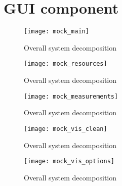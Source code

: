  
%


\section{GUI component}
\label{sec:arch_gui}

\begin{figure}[h]
  \centering
  \texttt{[image: mock\_main]}
  \caption{Overall system decomposition}
  \label{fig:arch_overall}
\end{figure}


\begin{figure}[h]
  \centering
  \texttt{[image: mock\_resources]}
  \caption{Overall system decomposition}
  \label{fig:arch_overall}
\end{figure}

\begin{figure}[h]
  \centering
  \texttt{[image: mock\_measurements]}
  \caption{Overall system decomposition}
  \label{fig:arch_overall}
\end{figure}

\begin{figure}[h]
  \centering
  \texttt{[image: mock\_vis\_clean]}
  \caption{Overall system decomposition}
  \label{fig:arch_overall}
\end{figure}

\begin{figure}[h]
  \centering
  \texttt{[image: mock\_vis\_options]}
  \caption{Overall system decomposition}
  \label{fig:arch_overall}
\end{figure}

